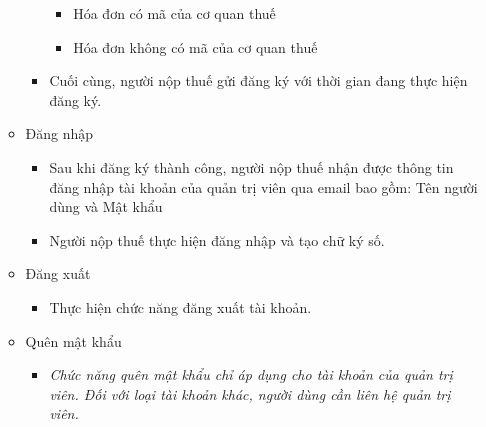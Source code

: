 \begin{itemize}
\begin{itemize}
\begin{itemize}
\begin{itemize}

\item Hóa đơn có mã của cơ quan thuế

\item Hóa đơn không có mã của cơ quan thuế

\end{itemize}

\item Cuối cùng, người nộp thuế gửi đăng ký với thời gian đang thực hiện đăng ký.



\end{itemize}

\item Đăng nhập

\begin{itemize}

\item Sau khi đăng ký thành công, người nộp thuế nhận được thông tin đăng nhập tài khoản của quản trị viên qua email bao gồm: Tên người dùng và Mật khẩu



\item Người nộp thuế thực hiện đăng nhập và tạo chữ ký số.

\end{itemize}

\item Đăng xuất

\begin{itemize}

\item Thực hiện chức năng đăng xuất tài khoản.

\end{itemize}

\item Quên mật khẩu

\begin{itemize}

\item \emph{Chức năng quên mật khẩu chỉ áp dụng cho tài khoản của quản trị viên. Đối với loại tài khoản khác, người dùng cần liên hệ quản trị viên.}


\end{itemize}
\end{itemize}
\end{itemize}
